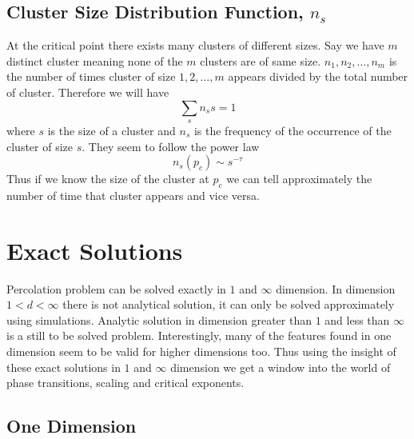 	\subsection{Cluster Size Distribution Function, $n_s$} \label{subsect:cluster-size-dist-func}
		At the critical point there exists many clusters of different sizes. Say we have $m$ distinct cluster meaning none of the $m$ clusters are of same size. $n_1, n_2, \ldots, n_m$ is the number of times cluster of size $1, 2, \ldots, m$ appears divided by the total number of cluster. Therefore we will have
		\begin{equation}
			\sum_{s} n_s s = 1
		\end{equation}
		where $s$ is the size of a cluster and $n_s$ is the frequency of the occurrence of the cluster of size $s$. They seem to follow the power law
		\begin{equation}
		n_s(p_c)\sim s^{-\tau}
		\end{equation}
		Thus if we know the size of the cluster at $p_c$ we can tell approximately the number of time that cluster appears and vice versa.
	

\section{Exact Solutions}
	Percolation problem can be solved exactly in $1$ and $\infty$ dimension. In dimension $1 < d < \infty$ there is not analytical solution, it can only be solved approximately using simulations. Analytic solution in dimension greater than $1$ and less than $\infty$ is a still to be solved problem. Interestingly, many of the features found in one dimension seem to be valid for higher dimensions too. Thus using the insight of these exact solutions in $1$ and $\infty$ dimension we get a window into the world of phase transitions, scaling and critical exponents.
	\subsection{One Dimension}
